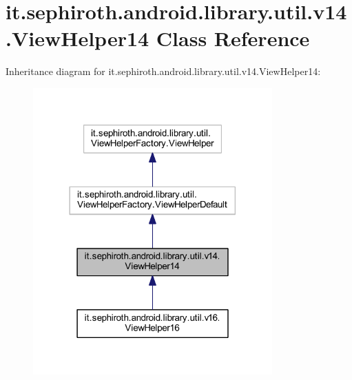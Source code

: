 \hypertarget{classit_1_1sephiroth_1_1android_1_1library_1_1util_1_1v14_1_1_view_helper14}{}\section{it.\+sephiroth.\+android.\+library.\+util.\+v14.\+View\+Helper14 Class Reference}
\label{classit_1_1sephiroth_1_1android_1_1library_1_1util_1_1v14_1_1_view_helper14}


Inheritance diagram for it.\+sephiroth.\+android.\+library.\+util.\+v14.\+View\+Helper14\+:
\nopagebreak
\begin{figure}[H]
\begin{center}
\leavevmode
\includegraphics[width=260pt]{classit_1_1sephiroth_1_1android_1_1library_1_1util_1_1v14_1_1_view_helper14__inherit__graph}
\end{center}
\end{figure}



